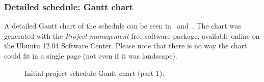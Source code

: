 \subsubsection{Detailed schedule: Gantt chart}

A detailed Gantt chart of the schedule can be seen in~ and~. The chart was generated with the \textit{Project management} free software package, available online on the Ubuntu 12.04 Software Center. Please note that there is no way the chart could fit in a single page (not even if it was landscape).

\begin{figure}[hbtp]
	\caption{Initial project schedule Gantt chart (part 1).}
	\label{fig:gantt-1}
\end{figure}

